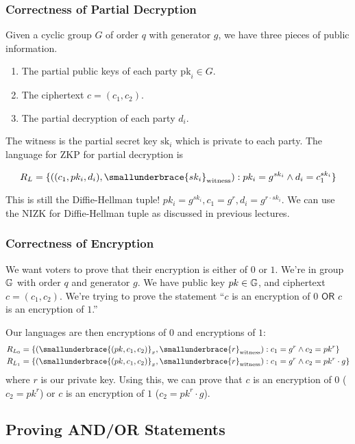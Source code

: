 \subsubsection{Correctness of Partial Decryption}

Given a cyclic group $G$ of order $q$ with generator $g$, we have three pieces of public information.
\begin{enumerate}
    \item The partial public keys of each party $\text{pk}_i \in G$.
    \item The ciphertext $c = (c_1, c_2)$.
    \item The partial decryption of each party $d_i$.
\end{enumerate}

The witness is the partial secret key $\text{sk}_i$ which is private to each party. The language for ZKP for partial decryption is

\[R_L = \{((c_1, pk_i, d_i), \smallunderbrace{sk_i}_{\text{witness}}): pk_i = g^{sk_i}\land d_i = c_1^{sk_i}\}\]

This is still the Diffie-Hellman tuple! $pk_i = g^{sk_i}, c_1 = g^r, d_i = g^{r\cdot sk_i}$. We can use the NIZK for Diffie-Hellman tuple as discussed in previous lectures.

\subsubsection{Correctness of Encryption}
We want voters to prove that their encryption is either of $0$ or $1$. We're in group $\mathbb G$ with order $q$ and generator $g$. We have public key $pk\in \mathbb G$, and ciphertext $c = (c_1, c_2)$. We're trying to prove the statement ``$c$ is an encryption of $0$ $\mathsf{OR}$ $c$ is an encryption of $1$.''

Our languages are then encryptions of $0$ and encryptions of $1$:
\begin{align*}
    R_{L_0} & = \{(\smallunderbrace{(pk, c_1, c_2)}_{x}, \smallunderbrace{r}_{\text{witness}}) : c_1 = g^r\land c_2 = pk^r\}        \\
    R_{L_1} & = \{(\smallunderbrace{(pk, c_1, c_2)}_{x}, \smallunderbrace{r}_{\text{witness}}) : c_1 = g^r\land c_2 = pk^r\cdot g\}
\end{align*}
where $r$ is our private key. Using this, we can prove that $c$ is an encryption of $0$ ($c_2 = pk^r$) or $c$ is an encryption of $1$ ($c_2 = pk^r\cdot g$).

\subsection{Proving AND/OR Statements}

